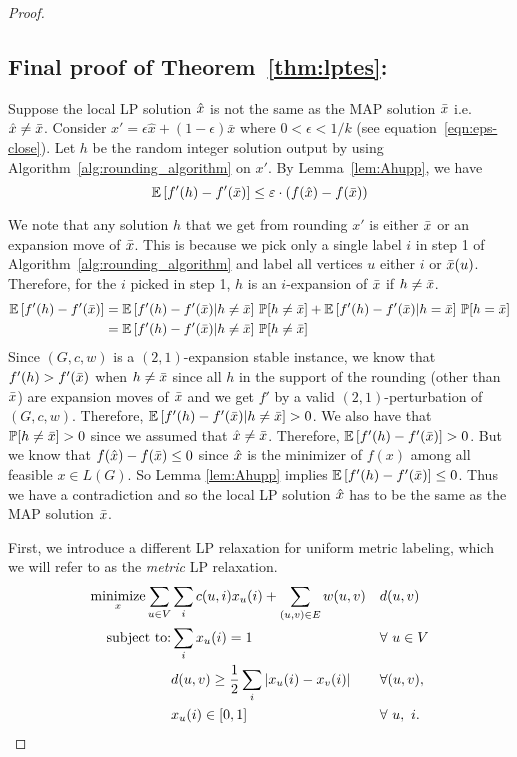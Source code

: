 \begin{proof}
\subsection{Final proof of Theorem~\ref{thm:lptes}:}\label{sec:finlpt}
Suppose the local LP solution $\hat{x}$ is not the same as the MAP solution $\bar{x}$ i.e. $\hat{x} \neq \bar{x}$. Consider $x' = \epsilon\hat{x} + (1-\epsilon)\bar{x}$ where $0< \epsilon < 1/k$ (see equation~\eqref{eqn:eps-close}).
Let $h$ be the random integer solution output by using Algorithm~\ref{alg:rounding_algorithm} on $x'$. By Lemma~\ref{lem:Ahupp}, we have 
\[ \operatorname*{\mathbb{E}}{[f'(h) - f'(\bar{x})]} \leq \varepsilon \cdot \left(f(\hat{x}) - f(\bar{x})\right) \]

We note that any solution $h$ that we get from rounding $x'$ is either $\bar{x}$ or an expansion move of $\bar{x}$. This is because we pick only a single label $i$ in step 1 of Algorithm~\ref{alg:rounding_algorithm} and label all vertices $u$ either $i$ or $\bar{x}(u)$. 
Therefore, for the $i$ picked in step 1, $h$ is an $i$-expansion of $\bar{x}$ if $h \neq \bar{x}$.
\begin{align*}
    \operatorname*{\mathbb{E}}{[f'(h) - f'(\bar{x})]} &= \operatorname*{\mathbb{E}}{[f'(h) - f'(\bar{x})|h\neq \bar{x}]}\ \mathbb{P}[h \neq \bar{x}] + \operatorname*{\mathbb{E}}{[f'(h) - f'(\bar{x})|h = \bar{x}]}\ \mathbb{P}[h = \bar{x}]
    \\&= \operatorname*{\mathbb{E}}{[f'(h) - f'(\bar{x})|h\neq \bar{x}]}\ \mathbb{P}[h \neq \bar{x}]
\end{align*}
Since $(G,c,w)$ is a $(2,1)$-expansion stable instance, we know that $f'(h) > f'(\bar{x})$ when $h \neq \bar{x}$ since all $h$ in the support of the rounding (other than $\bar{x}$) are expansion moves of $\bar{x}$ and we get $f'$ by a valid $(2,1)$-perturbation of $(G,c,w)$.
Therefore, $\operatorname*{\mathbb{E}}{[f'(h) - f'(\bar{x})|h\neq \bar{x}]} > 0$. We also have that $\mathbb{P}[h \neq \bar{x}] > 0$ since we assumed that $\hat{x} \neq \bar{x}$. Therefore, $\operatorname*{\mathbb{E}}{[f'(h) - f'(\bar{x})]} > 0$. But we know that $f(\hat{x}) - f(\bar{x}) \leq 0$ since $\hat{x}$ is the minimizer of $f(x)$ among all feasible $x \in L(G)$. So Lemma \ref{lem:Ahupp} implies $\operatorname*{\mathbb{E}}{[f'(h) - f'(\bar{x})]} \le 0$. Thus we have a contradiction and so the local LP solution $\hat{x}$ has to be the same as the MAP solution $\bar{x}$.

\iffalse
First, we introduce a different LP relaxation for uniform metric labeling, which we will refer to as the \emph{metric} LP relaxation.
\begin{alignat}{2}
  \mathop{\mathrm{minimize}{}}_{x}\sum_{u\in V}&\sum_i c(u,i)x_u(i) + \sum_{(u,v) \in E}w(u,v)&&d(u,v)\\
  \text{subject to:}& \sum_{i}x_u(i) = 1 &&\forall\ u\in V\\
                    & d(u,v) \ge \frac{1}{2}\sum_i|x_u(i) - x_v(i)| && \forall (u,v),\\
                   & x_{u}(i) \in [0,1]&& \forall\ u,\ i.
\end{alignat}


\end{proof}
